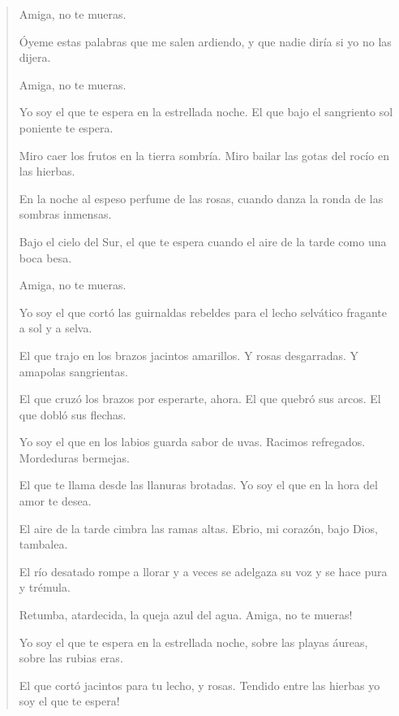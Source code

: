 \documentclass[12pt]{article}
\begin{document}
\clearpage
{}
\begin{verse}
Amiga, no te mueras.  
  
Óyeme estas palabras que me salen ardiendo,  
y que nadie diría si yo no las dijera.  
  
Amiga, no te mueras.  
  
Yo soy el que te espera en la estrellada noche.  
El que bajo el sangriento sol poniente te espera.  
  
Miro caer los frutos en la tierra sombría.  
Miro bailar las gotas del rocío en las hierbas.  
  
En la noche al espeso perfume de las rosas,  
cuando danza la ronda de las sombras inmensas.  
  
Bajo el cielo del Sur, el que te espera cuando  
el aire de la tarde como una boca besa.  
  
Amiga, no te mueras.  
  
Yo soy el que cortó las guirnaldas rebeldes  
para el lecho selvático fragante a sol y a selva.  
  
El que trajo en los brazos jacintos amarillos.  
Y rosas desgarradas. Y amapolas sangrientas.  
  
El que cruzó los brazos por esperarte, ahora.  
El que quebró sus arcos. El que dobló sus flechas.  
  
Yo soy el que en los labios guarda sabor de uvas.  
Racimos refregados. Mordeduras bermejas.  
  
El que te llama desde las llanuras brotadas.  
Yo soy el que en la hora del amor te desea.  
  
El aire de la tarde cimbra las ramas altas.  
Ebrio, mi corazón, bajo Dios, tambalea.  
  
El río desatado rompe a llorar y a veces  
se adelgaza su voz y se hace pura y trémula.  
  
Retumba, atardecida, la queja azul del agua.  
Amiga, no te mueras!  
  
Yo soy el que te espera en la estrellada noche,  
sobre las playas áureas, sobre las rubias eras.  
  
El que cortó jacintos para tu lecho, y rosas.  
Tendido entre las hierbas yo soy el que te espera!

\end{verse}
\end{document}
